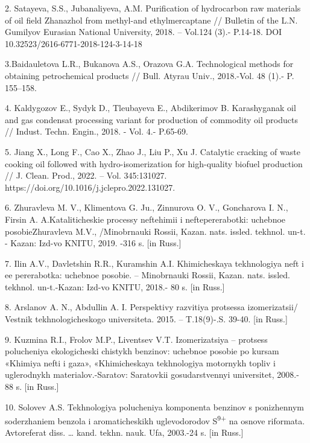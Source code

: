 2. Satayeva, S.S., Jubanaliyeva, A.M. Purification of hydrocarbon raw
materials of oil field Zhanazhol from methyl-and ethylmercaptane //
Bulletin of the L.N. Gumilyov Eurasian National University, 2018. --
Vol.124 (3).- P.14-18. DOI 10.32523/2616-6771-2018-124-3-14-18

3.Baidauletova L.R., Bukanova A.S., Orazova G.A. Technological methods
for obtaining petrochemical products // Bull. Atyrau Univ., 2018.-Vol.
48 (1).- P. 155--158.

4. Kaldygozov E., Sydyk D., Tleubayeva E., Abdikerimov B. Karashyganak
oil and gas condensat processing variant for production of commodity oil
products // Indust. Techn. Engin., 2018. - Vol. 4.- P.65-69.

5. Jiang X., Long F., Cao X., Zhao J., Liu P., Xu J. Catalytic cracking
of waste cooking oil followed with hydro-isomerization for high-quality
biofuel production // J. Clean. Prod., 2022. -- Vol. 345:131027.
https://doi.org/10.1016/j.jclepro.2022.131027.

6. Zhuravleva M. V., Klimentova G. Ju., Zinnurova O. V., Goncharova I.
N., Firsin A. A.Kataliticheskie processy neftehimii i neftepererabotki:
uchebnoe posobieZhuravleva M.V., /Minobrnauki Rossii, Kazan. nats.
issled. tekhnol. un-t. - Kazan\textquotesingle: Izd-vo KNITU, 2019. -316
s. {[}in Russ.{]}

7. Il\textquotesingle in A.V., Davletshin R.R., Kuramshin A.I.
Khimicheskaya tekhnologiya neft\textquotesingle{} i ee pererabotka:
uchebnoe posobie. -- Minobrnauki Rossii, Kazan. nats. issled. tekhnol.
un-t.-Kazan\textquotesingle: Izd-vo KNITU, 2018.- 80 s. {[}in Russ.{]}

8. Arslanov A. N., Abdullin A. I. Perspektivy razvitiya protsessa
izomerizatsii/ Vestnik tekhnologicheskogo universiteta. 2015. --
T.18(9)-.S. 39-40. {[}in Russ.{]}

9. Kuz\textquotesingle mina R.I., Frolov M.P., Liventsev V.T.
Izomerizatsiya -- protsess polucheniya ekologicheski chistykh benzinov:
uchebnoe posobie po kursam «Khimiya nefti i gaza», «Khimicheskaya
tekhnologiya motornykh topliv i uglerodnykh materialov.-Saratov:
Saratovkii gosudarstvennyi universitet, 2008.- 88 s. {[}in Russ.{]}

10. Solov\textquotesingle ev A.S. Tekhnologiya polucheniya komponenta
benzinov s ponizhennym soderzhaniem benzola i aromaticheskikh
uglevodorodov S\textsuperscript{9+} na osnove riformata. Avtoreferat
diss. \ldots{} kand. tekhn. nauk. Ufa, 2003.-24 s. {[}in Russ.{]}

